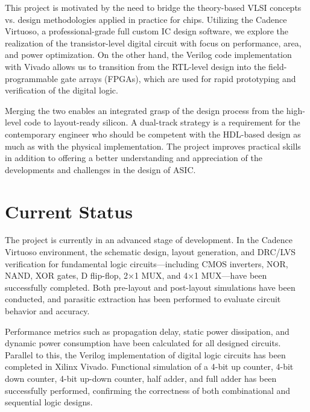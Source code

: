 \documentclass[12pt]{article}
\begin{document}
This project is motivated by the need to bridge the theory-based VLSI concepts vs. design methodologies applied in practice for chips. Utilizing the Cadence Virtuoso, a professional-grade full custom IC design software, we explore the realization of the transistor-level digital circuit with focus on performance, area, and power optimization. On the other hand, the Verilog code implementation with Vivado allows us to transition from the RTL-level design into the field-programmable gate arrays (FPGAs), which are used for rapid prototyping and verification of the digital logic.

Merging the two enables an integrated grasp of the design process from the high-level code to layout-ready silicon. A dual-track strategy is a requirement for the contemporary engineer who should be competent with the HDL-based design as much as with the physical implementation. The project improves practical skills in addition to offering a better understanding and appreciation of the developments and challenges in the design of ASIC.

\section{Current Status}

The project is currently in an advanced stage of development. In the Cadence Virtuoso environment, the schematic design, layout generation, and DRC/LVS verification for fundamental logic circuits—including CMOS inverters, NOR, NAND, XOR gates, D flip-flop, 2×1 MUX, and 4×1 MUX—have been successfully completed. Both pre-layout and post-layout simulations have been conducted, and parasitic extraction has been performed to evaluate circuit behavior and accuracy.

Performance metrics such as propagation delay, static power dissipation, and dynamic power consumption have been calculated for all designed circuits. Parallel to this, the Verilog implementation of digital logic circuits has been completed in Xilinx Vivado. Functional simulation of a 4-bit up counter, 4-bit down counter, 4-bit up-down counter, half adder, and full adder has been successfully performed, confirming the correctness of both combinational and sequential logic designs.
\end{document}
